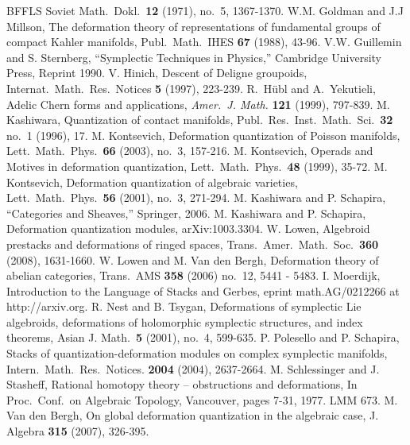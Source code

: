 \documentclass{conm-p-l}
\theoremstyle{definition}
\numberwithin{equation}{section}
\begin{document}
\begin{thebibliography}{BFFLS}
    Soviet Math.\ Dokl.\ \textbf{12} (1971), no.\ 5, 1367-1370. 
 W.M. Goldman and J.J Millson, 
   The deformation theory of representations of fundamental groups of
      compact Kahler manifolds, Publ.\ Math.\ IHES
      {\bf 67} (1988), 43-96.
 V.W. Guillemin and S. Sternberg,
    ``Symplectic Techniques in Physics,'' 
    Cambridge University Press, Reprint 1990.
 V. Hinich, 
    Descent of Deligne groupoids,
    Internat.\ Math.\ Res.\ Notices {\bf 5} (1997), 223-239.
 R.\ H\"{u}bl and A.\ Yekutieli,
    Adelic Chern forms and applications,  {\em Amer.\ J. Math.}
    \textbf{121} (1999), 797-839.
 M. Kashiwara, 
    Quantization of contact manifolds, 
    Publ.\ Res.\ Inst.\ Math.\ Sci.\ {\bf 32} no.\ 1 (1996), 17.
 M. Kontsevich,
    Deformation quantization of Poisson manifolds,
    Lett.\ Math.\ Phys.\ {\bf 66} (2003), no.\ 3, 157-216.
 M. Kontsevich,
    Operads and Motives in deformation quantization, 
    Lett.\ Math.\ Phys.\ {\bf 48} (1999), 35-72.
 M. Kontsevich,
    Deformation quantization of algebraic varieties,
    Lett.\ Math.\ Phys.\ {\bf 56} (2001), no.\ 3, 271-294.
 M. Kashiwara and P. Schapira,
    ``Categories and Sheaves,'' Springer, 2006.
 M. Kashiwara and P. Schapira,
  Deformation quantization modules, arXiv:1003.3304.
 W. Lowen, 
  Algebroid prestacks and deformations of ringed spaces,
  Trans.\ Amer.\ Math.\ Soc.\ {\bf 360} (2008), 1631-1660. 
 W. Lowen and M. Van den Bergh,
    Deformation theory of abelian categories,
    Trans.\ AMS {\bf 358} (2006) no.\ 12, 5441 - 5483.
 I. Moerdijk, 
    Introduction to the Language of Stacks and Gerbes,
    eprint math.AG/0212266 at http://arxiv.org.
 R. Nest and B. Tsygan, 
    Deformations of symplectic Lie algebroids, 
    deformations of holomorphic symplectic structures, 
    and index theorems,  
    Asian J. Math.\ \textbf{5} (2001), no.\ 4, 599-635. 
 P. Polesello and P. Schapira, 
    Stacks of quantization-deformation modules on complex
    symplectic manifolds, 
    Intern.\ Math.\ Res.\ Notices. {\bf 2004} (2004), 2637-2664. 
 M. Schlessinger and J. Stasheff,
  Rational homotopy theory -- obstructions and deformations,
  In Proc.\ Conf.\ on Algebraic Topology, Vancouver, pages 7-31, 1977. 
  LMM 673.
 M. Van den Bergh,
    On global deformation quantization in the algebraic case,
    J. Algebra {\bf 315} (2007), 326-395.

\end{thebibliography}
\end{document}
